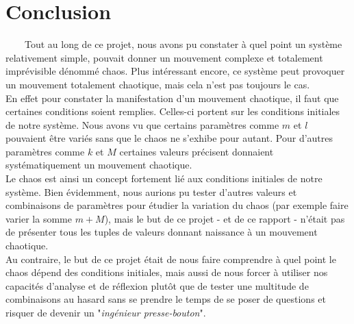 \newpage
\section{Conclusion}
\ \ \ \ Tout au long de ce projet, nous avons pu constater à quel point un système relativement simple,
pouvait donner un mouvement complexe et totalement imprévisible dénommé chaos. Plus intéressant encore,
ce système peut provoquer un mouvement totalement chaotique, mais cela n'est pas toujours le cas.\\

En effet pour constater la manifestation d'un mouvement chaotique, il faut que certaines conditions 
soient remplies. Celles-ci portent sur les conditions initiales de notre système. Nous avons vu que 
certains paramètres comme $m$ et $l$ pouvaient être variés sans que le chaos ne s'exhibe pour autant.
Pour d'autres paramètres comme $k$ et $M$ certaines valeurs précisent donnaient systématiquement un
mouvement chaotique.\\

Le chaos est ainsi un concept fortement lié aux conditions initiales de notre système. Bien évidemment,
nous aurions pu tester d'autres valeurs et combinaisons de paramètres pour étudier la variation du chaos
(par exemple faire varier la somme $m+M$), mais le but de ce projet - et de ce rapport - n'était pas de 
présenter tous les tuples de valeurs donnant naissance à un mouvement chaotique. \\

Au contraire, le but de ce projet était de nous faire comprendre à quel point le chaos dépend des 
conditions initiales, mais aussi de nous forcer à utiliser nos capacités d'analyse et de réflexion plutôt
que de tester une multitude de combinaisons au hasard sans se prendre le temps de se poser de questions
et risquer de devenir un "\textit{ingénieur presse-bouton}".
